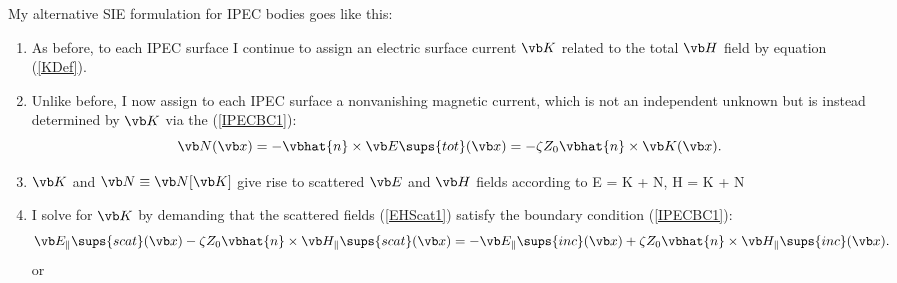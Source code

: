 \documentclass{article}
\begin{document}
My alternative SIE formulation for IPEC bodies goes like this:
%
\begin{enumerate}
 \item As before, to each IPEC surface I continue to assign an electric
       surface current $\vb K$ related to the total $\vb H$ field 
       by equation (\ref{KDef}).
 \item Unlike before, I now assign to each IPEC
       surface a nonvanishing magnetic current, which is
       not an independent unknown but is instead
       determined by $\vb K$ via the (\ref{IPECBC1}):
       $$\vb N(\vb x) = -\vbhat{n}\times \vb E\sups{tot}(\vb x)
                      = -\zeta Z_0 \vbhat{n}\times \vb K(\vb x).
       $$
 \item $\vb K$ and $\vb N\equiv \vb N[\vb K]$ give rise to scattered $\vb E$ and 
       $\vb H$ fields according to
       { \vb E =
           \BG{} \star \vb K
          +\BG{} \star \vb N,
          \qquad
         \vb H =
          \BG{} \star \vb K
         +\BG{} \star \vb N
       }
 \item I solve for $\vb K$ by demanding that the scattered fields
       (\ref{EHScat1})
       satisfy the boundary condition (\ref{IPECBC1}):
       $$
           \vb E_{\parallel}\sups{scat}(\vb x) 
            -\zeta Z_0 \vbhat{n}\times \vb H_{\parallel}\sups{scat}(\vb x)
       = 
          -\vb E_{\parallel}\sups{inc}(\vb x) 
            +\zeta Z_0 \vbhat{n}\times \vb H_{\parallel}\sups{inc}(\vb x).
       $$
       or
       \begin{align*}

\end{align*}
\end{enumerate}
\end{document}
